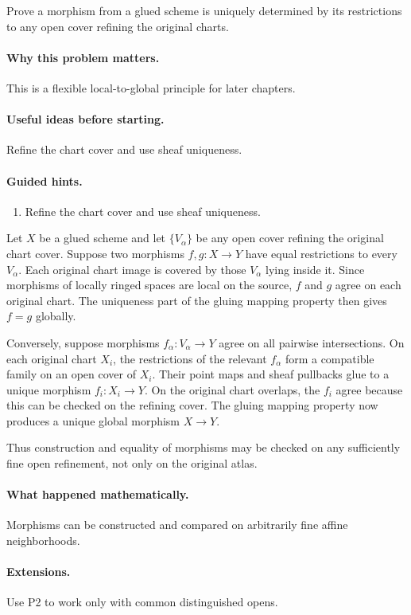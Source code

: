 \begin{problem}\label{prob:vi20-p19}
Prove a morphism from a glued scheme is uniquely determined by its restrictions to any open cover refining the original charts.
\end{problem}

\ifdefined\FullProblemDossiers
\paragraph{Why this problem matters.}
This is a flexible local-to-global principle for later chapters.

\paragraph{Useful ideas before starting.}
Refine the chart cover and use sheaf uniqueness.

\paragraph{Guided hints.}
\begin{enumerate}
\item Refine the chart cover and use sheaf uniqueness.
\end{enumerate}

\begin{solution}
Let $X$ be a glued scheme and let $\{V_\alpha\}$ be any open cover refining the original chart cover.  Suppose two morphisms $f,g:X\to Y$ have equal restrictions to every $V_\alpha$.  Each original chart image is covered by those $V_\alpha$ lying inside it.  Since morphisms of locally ringed spaces are local on the source, $f$ and $g$ agree on each original chart.  The uniqueness part of the gluing mapping property then gives $f=g$ globally.

Conversely, suppose morphisms $f_\alpha:V_\alpha\to Y$ agree on all pairwise intersections.  On each original chart $X_i$, the restrictions of the relevant $f_\alpha$ form a compatible family on an open cover of $X_i$.  Their point maps and sheaf pullbacks glue to a unique morphism $f_i:X_i\to Y$.  On the original chart overlaps, the $f_i$ agree because this can be checked on the refining cover.  The gluing mapping property now produces a unique global morphism $X\to Y$.

Thus construction and equality of morphisms may be checked on any sufficiently fine open refinement, not only on the original atlas.
\end{solution}


\paragraph{What happened mathematically.}
Morphisms can be constructed and compared on arbitrarily fine affine neighborhoods.

\paragraph{Extensions.}
Use P2 to work only with common distinguished opens.
\fi
